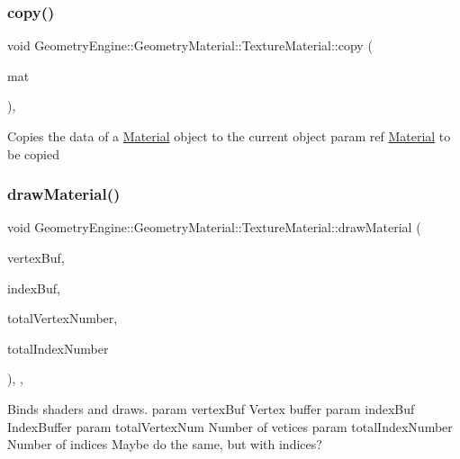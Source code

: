 \subsubsection{\texorpdfstring{copy()}{copy()}}
{\footnotesize\ttfamily void Geometry\+Engine\+::\+Geometry\+Material\+::\+Texture\+Material\+::copy (\begin{DoxyParamCaption}\item[{const \mbox{\hyperlink{class_geometry_engine_1_1_geometry_material_1_1_texture_material}{Texture\+Material}} \&}]{mat }\end{DoxyParamCaption})\hspace{0.3cm}{\ttfamily [protected]}, {\ttfamily [virtual]}}

Copies the data of a \mbox{\hyperlink{class_geometry_engine_1_1_geometry_material_1_1_material}{Material}} object to the current object param ref \mbox{\hyperlink{class_geometry_engine_1_1_geometry_material_1_1_material}{Material}} to be copied \mbox{\label{class_geometry_engine_1_1_geometry_material_1_1_texture_material_a7bb3c956fa64e47b251d882890c931f9}} 
\subsubsection{\texorpdfstring{drawMaterial()}{drawMaterial()}}
{\footnotesize\ttfamily void Geometry\+Engine\+::\+Geometry\+Material\+::\+Texture\+Material\+::draw\+Material (\begin{DoxyParamCaption}\item[{Q\+Open\+G\+L\+Buffer $\ast$}]{vertex\+Buf,  }\item[{Q\+Open\+G\+L\+Buffer $\ast$}]{index\+Buf,  }\item[{unsigned int}]{total\+Vertex\+Number,  }\item[{unsigned int}]{total\+Index\+Number }\end{DoxyParamCaption})\hspace{0.3cm}{\ttfamily [override]}, {\ttfamily [protected]}, {\ttfamily [virtual]}}

Binds shaders and draws. param vertex\+Buf Vertex buffer param index\+Buf Index\+Buffer param total\+Vertex\+Num Number of vetices param total\+Index\+Number Number of indices Maybe do the same, but with indices?


